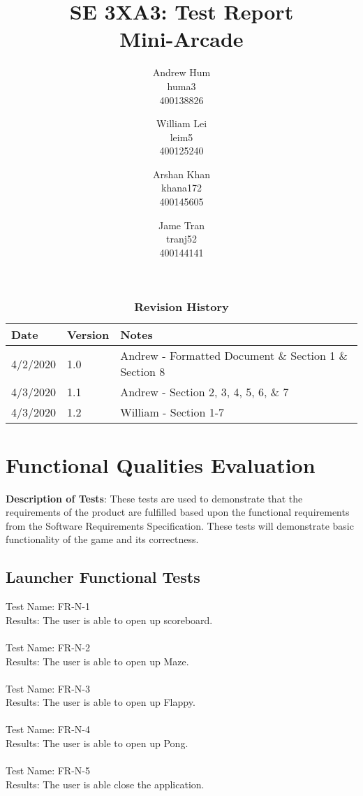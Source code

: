 \documentclass[12pt, titlepage]{article}
\title{SE 3XA3: Test Report\\Mini-Arcade}
\author{Andrew Hum \\ huma3 \\ 400138826 \and
		William Lei \\ leim5 \\ 400125240 \and
		Arshan Khan \\ khana172 \\ 400145605 \and
		Jame Tran \\ tranj52 \\ 400144141
}
\date{}
\begin{document}
\maketitle
\newpage
\tableofcontents
\listoftables
\listoffigures

\begin{table}[!hbp]
\caption{\bf Revision History}
\begin{tabularx}{\textwidth}{p{3cm}p{2cm}X}
\toprule {\bf Date} & {\bf Version} & {\bf Notes} \\
\midrule
4/2/2020 & 1.0 & Andrew - Formatted Document \& Section 1 \& Section 8\\
4/3/2020 & 1.1 & Andrew - Section 2, 3, 4, 5, 6, \& 7 \\
4/3/2020 & 1.2 & William - Section 1-7 \\ 
\bottomrule
\end{tabularx}
\end{table}

\newpage

\section{Functional Qualities Evaluation}

\textbf{Description of Tests}: These tests are used to demonstrate that the requirements of the product are fulfilled based upon the functional requirements from the Software Requirements Specification. These tests will demonstrate basic functionality of the game and its correctness. \\
	
\subsection{Launcher Functional Tests}
	Test Name: FR-N-1\\
	Results: The user is able to open up scoreboard.\\ \\
	Test Name: FR-N-2\\
	Results: The user is able to open up Maze.\\ \\
	Test Name: FR-N-3\\
	Results: The user is able to open up Flappy.\\ \\
	Test Name: FR-N-4\\
	Results: The user is able to open up Pong.\\ \\
	Test Name: FR-N-5\\
	Results: The user is able close the application.\\ \\
\end{document}
